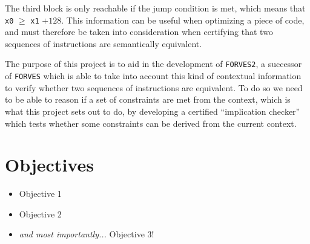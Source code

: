 \begin{center}
\end{center}

The third block is only reachable if the jump condition is met, which means that \verb|x0| $\ge$ 
\verb|x1| $+ 128$. This information can be useful when optimizing a piece of code, and must therefore
be taken into consideration when certifying that two sequences of instructions are semantically 
equivalent. 



The purpose of this project is to aid in the development of \verb|FORVES2|, a successor of 
\verb|FORVES| which is able to take into account this kind of contextual information to verify whether
two sequences of instructions are equivalent. To do so we need to be able to reason if a set of
constraints are met from the context, which is what this project sets out to do, by developing a 
certified ``implication checker'' which tests whether some constraints can be derived from the current
context.

\section{Objectives}
\label{sect:objectives}

\begin{itemize}
    \item Objective 1
    \item Objective 2
    \item \emph{and most importantly...} Objective 3!
\end{itemize}


